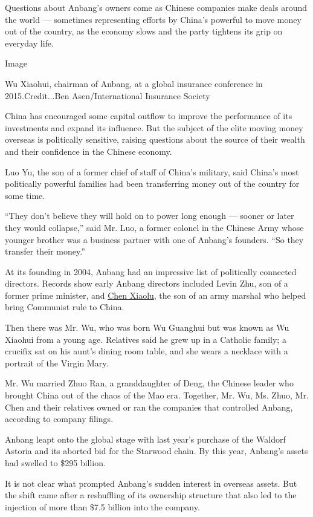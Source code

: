Questions about Anbang's owners come as Chinese companies make deals
around the world --- sometimes representing efforts by China's powerful
to move money out of the country, as the economy slows and the party
tightens its grip on everyday life.

Image

Wu Xiaohui, chairman of Anbang, at a global insurance conference in
2015.Credit...Ben Asen/International Insurance Society

China has encouraged some capital outflow to improve the performance of
its investments and expand its influence. But the subject of the elite
moving money overseas is politically sensitive, raising questions about
the source of their wealth and their confidence in the Chinese economy.

Luo Yu, the son of a former chief of staff of China's military, said
China's most politically powerful families had been transferring money
out of the country for some time.

``They don't believe they will hold on to power long enough --- sooner
or later they would collapse,'' said Mr. Luo, a former colonel in the
Chinese Army whose younger brother was a business partner with one of
Anbang's founders. ``So they transfer their money.''

At its founding in 2004, Anbang had an impressive list of politically
connected directors. Records show early Anbang directors included Levin
Zhu, son of a former prime minister, and
\href{http://www.nytimes.com/2013/12/07/world/asia/a-student-leader-in-maos-cultural-revolution.html}{Chen
Xiaolu}, the son of an army marshal who helped bring Communist rule to
China.

Then there was Mr. Wu, who was born Wu Guanghui but was known as Wu
Xiaohui from a young age. Relatives said he grew up in a Catholic
family; a crucifix sat on his aunt's dining room table, and she wears a
necklace with a portrait of the Virgin Mary.

Mr. Wu married Zhuo Ran, a granddaughter of Deng, the Chinese leader who
brought China out of the chaos of the Mao era. Together, Mr. Wu, Ms.
Zhuo, Mr. Chen and their relatives owned or ran the companies that
controlled Anbang, according to company filings.

Anbang leapt onto the global stage with last year's purchase of the
Waldorf Astoria and its aborted bid for the Starwood chain. By this
year, Anbang's assets had swelled to \$295 billion.

It is not clear what prompted Anbang's sudden interest in overseas
assets. But the shift came after a reshuffling of its ownership
structure that also led to the injection of more than \$7.5 billion into
the company.

